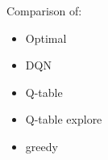 \documentclass[aspectratio=169]{beamer}
\begin{document}
\begin{frame}
    \frametitle{\secname}
    \framesubtitle{\subsecname}

    \begin{minipage}{0.3\textwidth}
        Comparison of:
        \begin{itemize}
            \item Optimal
            \item DQN
            \item Q-table
            \item Q-table explore
            \item greedy
        \end{itemize}
    \end{minipage}
    \begin{minipage}{0.63\textwidth}
    \begin{figure}
        \centering
        

\end{figure}
\end{minipage}
\end{frame}
\end{document}
